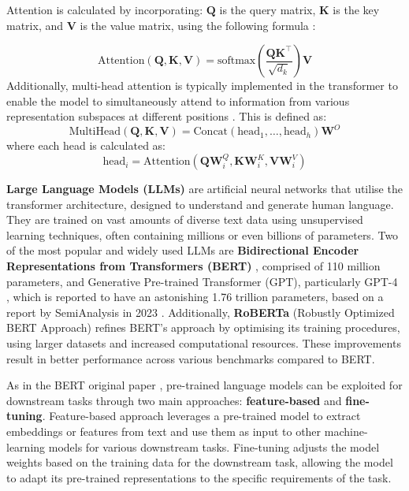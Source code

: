 Attention is calculated by incorporating: \(\mathbf{Q}\) is the query matrix, \(\mathbf{K}\) is the key matrix, and \(\mathbf{V}\) is the value matrix, using the following formula \cite{vaswani-2023-attention}:

\begin{equation}
    \label{eq:attention}
    \text{Attention}(\mathbf{Q}, \mathbf{K}, \mathbf{V}) = \text{softmax}\left( \frac{\mathbf{Q}\mathbf{K}^\top}{\sqrt{d_k}} \right) \mathbf{V}
\end{equation}
Additionally, multi-head attention is typically implemented in the transformer to enable the model to simultaneously attend to information from various representation subspaces at different positions \cite{vaswani-2023-attention}. This is defined as:
\begin{equation}
    \label{eq:multihead}
    \text{MultiHead}(\mathbf{Q}, \mathbf{K}, \mathbf{V}) = \text{Concat}(\text{head}_1, \ldots, \text{head}_h) \mathbf{W}^O
\end{equation}
where each head is calculated as:
\begin{equation}
    \label{eq:head}
    \text{head}_i = \text{Attention}(\mathbf{Q} \mathbf{W}^Q_i, \mathbf{K} \mathbf{W}^K_i, \mathbf{V} \mathbf{W}^V_i)
\end{equation}


\textbf{Large Language Models (LLMs)} are artificial neural networks that utilise the transformer architecture, designed to understand and generate human language. They are trained on vast amounts of diverse text data using unsupervised learning techniques, often containing millions or even billions of parameters. Two of the most popular and widely used LLMs are \textbf{Bidirectional Encoder Representations from Transformers (BERT)} \cite{devlin-2019-bert}, comprised of 110 million parameters, and Generative Pre-trained Transformer (GPT), particularly GPT-4 \cite{openai-2024-gpt4}, which is reported to have an astonishing 1.76 trillion parameters, based on a report by SemiAnalysis in 2023 \cite{semianalysis-gpt4}. Additionally, \textbf{RoBERTa} \cite{liu-2019-roberta} (Robustly Optimized BERT Approach) refines BERT's approach by optimising its training procedures, using larger datasets and increased computational resources. These improvements result in better performance across various benchmarks compared to BERT.

As in the BERT original paper \cite{devlin-2019-bert}, pre-trained language models can be exploited for downstream tasks through two main approaches: \textbf{feature-based} and \textbf{fine-tuning}. Feature-based approach \cite{devlin-2019-bert} leverages a pre-trained model to extract embeddings or features from text and use them as input to other machine-learning models for various downstream tasks. Fine-tuning \cite{devlin-2019-bert} adjusts the model weights based on the training data for the downstream task, allowing the model to adapt its pre-trained representations to the specific requirements of the task.

